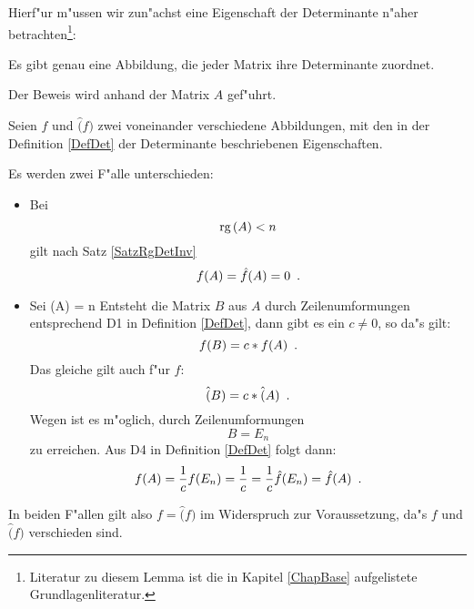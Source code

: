 Hierf"ur m"ussen wir zun"achst eine Eigenschaft der Determinante n"aher
betrachten\footnote{Literatur zu diesem Lemma ist die in Kapitel 
\ref{ChapBase} aufgelistete Grundlagenliteratur.}:
\begin{lemma}
\label{SatzDetEindeutig}
    Es gibt genau eine Abbildung, die jeder Matrix ihre Determinante
    zuordnet.
\end{lemma}
\begin{beweis}
    Der Beweis wird anhand der Matrix $A$ gef"uhrt.

    Seien $f$ und $\hat(f)$ zwei voneinander verschiedene Abbildungen, mit
    den in der Definition \ref{DefDet} der Determinante beschriebenen
    Eigenschaften.

    Es werden zwei F"alle unterschieden:
    \begin{itemize}
    \item
          Bei \[ \mbox{\rm rg} \,(A) < n \] gilt nach Satz \ref{SatzRgDetInv}
          \[ f(A) = \hat{f}(A) = 0 \mbox{\hspace{0.5em}.} \]
    \item
          Sei   \rg(A) = n \MyPunkt \Eeq
          Entsteht die Matrix $B$ aus $A$ durch Zeilenumformungen 
          entsprechend D1 in Definition \ref{DefDet}, dann gibt es 
          ein $c \neq 0$, so da"s gilt: 
          \[ f(B) = c * f(A) \mbox{\hspace{0.5em}.} \]
          Das gleiche gilt auch f"ur $\hat{f}$:
          \[ \hat(B) = c * \hat(A) \mbox{\hspace{0.5em}.} \]
          Wegen  ist es m"oglich, durch
          Zeilenumformungen \[ B = E_n \] zu erreichen. Aus D4 in 
          Definition \ref{DefDet} folgt dann:
          \[ f(A) = \frac{1}{c} f(E_n) = \frac{1}{c} 
                  = \frac{1}{c}\hat{f}(E_n) = \hat{f}(A) \mbox{\hspace{0.5em}.}
          \]
    \end{itemize}
    In beiden F"allen gilt also $ f = \hat(f) $ im Widerspruch zur 
    Voraussetzung, da"s $f$ und $\hat(f)$ verschieden sind.
\end{beweis}

